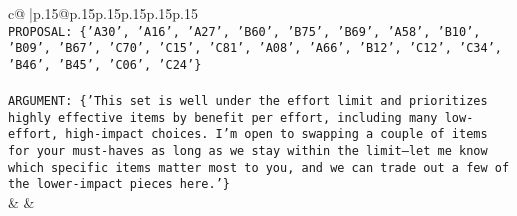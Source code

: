 \documentclass{article}
\begin{document}
{\begin{supertabular}{c@{$\;$}|p{.15\linewidth}@{}p{.15\linewidth}p{.15\linewidth}p{.15\linewidth}p{.15\linewidth}p{.15\linewidth}}
{{{\\ 
\texttt{PROPOSAL: \{'A30', 'A16', 'A27', 'B60', 'B75', 'B69', 'A58', 'B10', 'B09', 'B67', 'C70', 'C15', 'C81', 'A08', 'A66', 'B12', 'C12', 'C34', 'B46', 'B45', 'C06', 'C24'\}} \\
\\ 
\texttt{ARGUMENT: \{'This set is well under the effort limit and prioritizes highly effective items by benefit per effort, including many low{-}effort, high{-}impact choices. I’m open to swapping a couple of items for your must{-}haves as long as we stay within the limit—let me know which specific items matter most to you, and we can trade out a few of the lower{-}impact pieces here.'\}} \\
            }
        }
    }
    & & \\ \\


\end{supertabular}}
\end{document}
